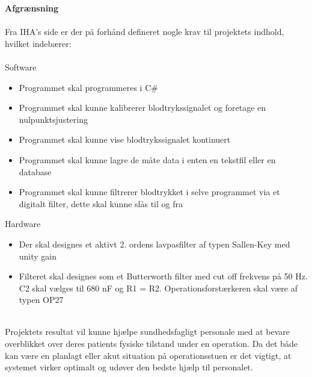 \textbf{Afgrænsning}\\ \\
Fra IHA’s side er der på forhånd defineret nogle krav til projektets indhold, hvilket indebærer:\\ \\
Software 
\begin{itemize}
	\item Programmet skal programmeres i C\#
	\item Programmet skal kunne kalibrerer blodtrykssignalet og foretage en nulpunktsjustering
	\item Programmet skal kunne vise blodtrykssignalet kontinuert
	\item Programmet skal kunne lagre de måte data i enten en tekstfil eller en database
	\item Programmet skal kunne filtrerer blodtrykket i selve programmet via et digitalt filter, dette skal kunne slås til og fra
\end{itemize}

Hardware
\begin{itemize}
	\item Der skal designes et aktivt 2. ordens lavpasfilter af typen Sallen-Key med unity gain
	\item Filteret skal designes som et Butterworth filter med cut off frekvens på 50 Hz. C2 skal vælges til 680 nF og R1 = R2. Operationsforstærkeren skal være af typen OP27
\end{itemize}
\\
Projektets resultat vil kunne hjælpe sundhedsfagligt personale med at bevare overblikket over deres patients fysiske tilstand under en operation. Da det både kan være en planlagt eller akut situation på operationsstuen er det vigtigt, at systemet virker optimalt og udøver den bedste hjælp til personalet.\\
\\ 
